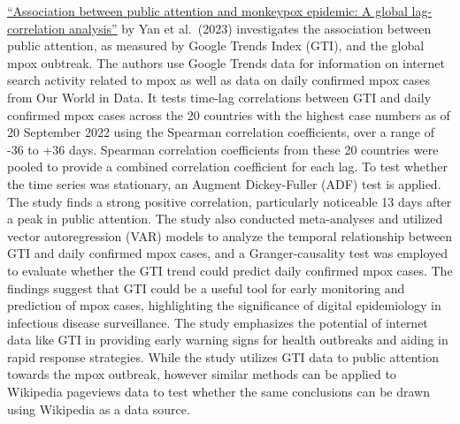 \documentclass[
  letterpaper,
  DIV=11,
  numbers=noendperiod]{scrartcl}
\begin{document}
\href{https://doi.org/10.1002\%2Fjmv.28382}{``Association between public
attention and monkeypox epidemic: A global lag-correlation analysis''}
by Yan et al.~(2023) investigates the association between public
attention, as measured by Google Trends Index (GTI), and the global mpox
oubtreak. The authors use Google Trends data for information on internet
search activity related to mpox as well as data on daily confirmed mpox
cases from Our World in Data. It tests time-lag correlations between GTI
and daily confirmed mpox cases across the 20 countries with the highest
case numbers as of 20 September 2022 using the Spearman correlation
coefficients, over a range of -36 to +36 days. Spearman correlation
coefficients from these 20 countries were pooled to provide a combined
correlation coefficient for each lag. To test whether the time series
was stationary, an Augment Dickey-Fuller (ADF) test is applied. The
study finds a strong positive correlation, particularly noticeable 13
days after a peak in public attention. The study also conducted
meta-analyses and utilized vector autoregression (VAR) models to analyze
the temporal relationship between GTI and daily confirmed mpox cases,
and a Granger-causality test was employed to evaluate whether the GTI
trend could predict daily confirmed mpox cases. The findings suggest
that GTI could be a useful tool for early monitoring and prediction of
mpox cases, highlighting the significance of digital epidemiology in
infectious disease surveillance. The study emphasizes the potential of
internet data like GTI in providing early warning signs for health
outbreaks and aiding in rapid response strategies. While the study
utilizes GTI data to public attention towards the mpox outbreak, however
similar methods can be applied to Wikipedia pageviews data to test
whether the same conclusions can be drawn using Wikipedia as a data
source.
\end{document}
